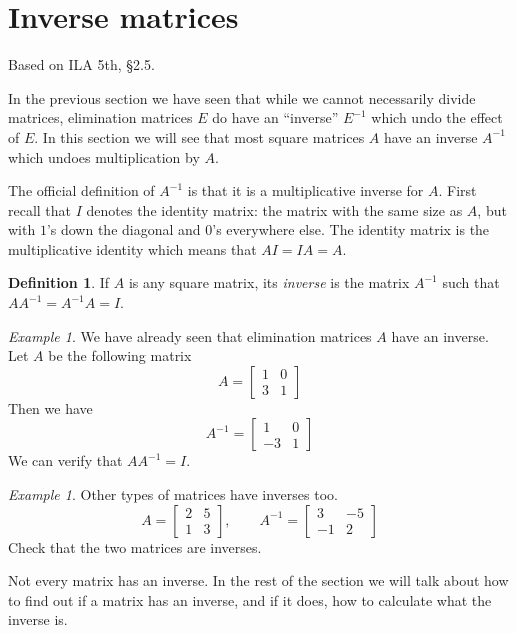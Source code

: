 \documentclass[11pt,oneside]{amsbook}
\theoremstyle{definition}
\theoremstyle{plain}
\theoremstyle{definition}
\newtheorem{definition}[theorem]{Definition}
\theoremstyle{remark}
\newtheorem{example}[theorem]{Example}
\numberwithin{equation}{section}
\numberwithin{figure}{section}
\begin{document}
\newpage
\section{Inverse matrices}

Based on ILA 5th, \S 2.5.

In the previous section we have seen that while we cannot necessarily divide matrices, elimination matrices $E$ do have an ``inverse'' $E^{-1}$ which undo the effect of $E$. In this section we will see that most square matrices $A$ have an inverse $A^{-1}$ which undoes multiplication by $A$.

The official definition of $A^{-1}$ is that it is a multiplicative inverse for $A$. First recall that $I$ denotes the identity matrix: the matrix with the same size as $A$, but with $1$'s down the diagonal and $0$'s everywhere else. The identity matrix is the multiplicative identity which means that $AI=IA=A$.

\begin{definition}
  If $A$ is any square matrix, its \emph{inverse} is the matrix $A^{-1}$ such that $AA^{-1}=A^{-1}A=I$.
\end{definition}

\begin{example}
  We have already seen that elimination matrices $A$ have an inverse. Let $A$ be the following matrix
  \[A=\begin{bmatrix}1&0\\3&1\end{bmatrix}
  \]
  Then we have
  \[A^{-1}=\begin{bmatrix}1&0\\-3&1\end{bmatrix}
  \]
  We can verify that $AA^{-1}=I$.
\end{example}

\begin{example}
  Other types of matrices have inverses too.
  \[A=\begin{bmatrix}2&5\\1&3\end{bmatrix},\qquad
    A^{-1}=\begin{bmatrix}3&-5\\-1&2\end{bmatrix}
  \]
  Check that the two matrices are inverses.
\end{example}


Not every matrix has an inverse. In the rest of the section we will talk about how to find out if a matrix has an inverse, and if it does, how to calculate what the inverse is.
\end{document}
